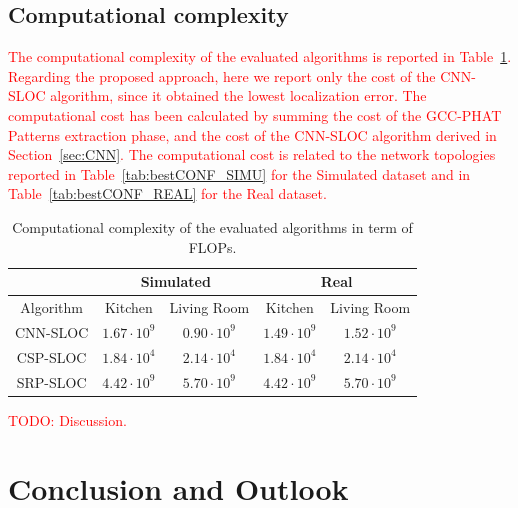 \documentclass[review]{elsarticle}
\newcommand{\secref}[1]{Section~\ref{#1}}
\newcommand{\tableref}[1]{Table~\ref{#1}}
\begin{document}
\subsection{Computational complexity}
\textcolor{red}{
The computational complexity of the evaluated algorithms is reported in \tableref{tab:comp_cost}. Regarding the proposed approach, here we report only the cost of the CNN-SLOC algorithm, since it obtained the lowest localization error. The computational cost has been calculated by summing the cost of the GCC-PHAT Patterns extraction phase, and the cost of the CNN-SLOC algorithm derived in \secref{sec:CNN}. The computational cost is related to the network topologies reported in \tableref{tab:bestCONF_SIMU} for the Simulated dataset and in \tableref{tab:bestCONF_REAL} for the Real dataset.
}


\begin{table}[t]
\centering
\caption{Computational complexity of the evaluated algorithms in term of FLOPs.}\label{tab:comp_cost}
\begin{tabular}{c | c | c | c | c}
\hline
 & \multicolumn{2}{c|}{Simulated} & \multicolumn{2}{c}{Real} \\
\hline
Algorithm          &  Kitchen & Living Room & Kitchen & Living Room \\
\hline
CNN-SLOC & $1.67 \cdot 10^9$  &   $0.90 \cdot 10^9$  & $1.49  \cdot 10^9$    & $1.52\cdot 10^9$     \\
CSP-SLOC  &  $1.84 \cdot 10^4$  & $2.14 \cdot 10^4$ &   $1.84 \cdot 10^4$        &  $2.14 \cdot 10^4$    \\
SRP-SLOC & $4.42 \cdot 10^9$  & $5.70 \cdot 10^9 $ &  $4.42 \cdot 10^9$ &  $5.70 \cdot 10^9 $ \\    \hline
\end{tabular}
\end{table}


\textcolor{red}{TODO: Discussion.}

\section{Conclusion and Outlook}
\label{sec:concl}
\end{document}
